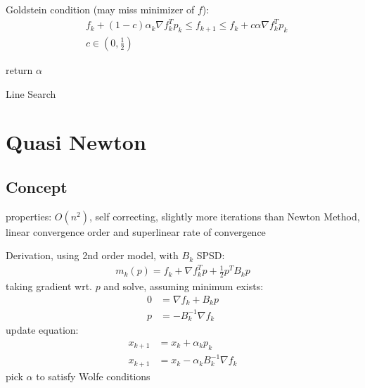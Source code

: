 \documentclass[8pt,letter]{article}
\begin{document}
\begin{multicols*}{2}
  Goldstein condition (may miss minimizer of $f$):
  \begin{align}
    &f_k+(1-c) \alpha_k \nabla f_k^T p_k \leq f_{k+1} \leq f_k + c \alpha \nabla f_k^T p_k\\
    &c \in (0,\frac{1}{2})
  \end{align}
  
  \begin{algorithm}[H]
    return $\alpha$
    \caption{Line Search\label{Algo_LineSearch}}
  \end{algorithm}
  

  \section{Quasi Newton}

  \subsection{Concept}
  properties: $O(n^2)$, self correcting, slightly more iterations than Newton Method, linear convergence order and superlinear rate of convergence

  Derivation, using 2nd order model, with $B_k$ SPSD:
  \begin{align*}  
    m_k(p)=f_k + \nabla f_k^T p + \frac{1}{2} p^T B_k p
  \end{align*}
  taking gradient wrt. $p$ and solve, assuming minimum exists:
  \begin{align*}  
    0 & = \nabla f_k + B_k p\\
    p & = - B_k^{-1} \nabla f_k
  \end{align*}
  update equation:
  \begin{align*}
    x_{k+1} & = x_k + \alpha_k p_k\\
    x_{k+1} & = x_k - \alpha_k B_k^{-1} \nabla f_k
  \end{align*}
  pick $\alpha$ to satisfy Wolfe conditions


\end{multicols*}
\end{document}

